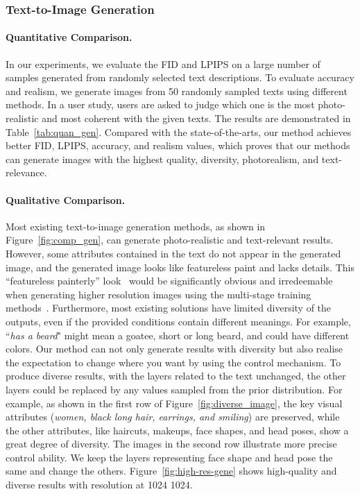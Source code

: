 \documentclass[final]{cvpr}
\begin{document}
\subsubsection{Text-to-Image Generation}
\label{subsec:exp_gen}

\paragraph{Quantitative Comparison.}
In our experiments, we evaluate the FID and LPIPS on a large number of samples generated from randomly selected text descriptions. 
To evaluate accuracy and realism, we generate images from 50 randomly sampled texts using different methods. In a user study, users are asked to judge which one is the most photo-realistic and most coherent with the given texts. 
The results are demonstrated in Table~\ref{tab:quan_gen}. 
Compared with the state-of-the-arts, our method achieves better FID, LPIPS, accuracy, and realism values, which proves that our methods can generate images with the highest quality, diversity, photorealism, and text-relevance. 

\vspace{-5pt}
\paragraph{Qualitative Comparison.} 
Most existing text-to-image generation methods, as shown in Figure~\ref{fig:comp_gen}, can generate photo-realistic and text-relevant results.
However, some attributes contained in the text do not appear in the generated image, and the generated image looks like featureless paint and lacks details.
This ``featureless painterly'' look~\cite{karras2019style} would be significantly obvious and irredeemable when generating higher resolution images using the multi-stage training methods~\cite{xu2018attngan,li2019control,zhu2019dmgan}.
Furthermore, most existing solutions have limited diversity of the outputs, even if the provided conditions contain different meanings. For example, ``\textit{has a beard}" might mean a goatee, short or long beard, and could have different colors.
Our method can not only generate results with diversity but also realise the expectation to change where you want by using the control mechanism.
To produce diverse results, with the layers related to the text unchanged, the other layers could be replaced by any values sampled from the prior distribution. 
For example, as shown in the first row of Figure~\ref{fig:diverse_image}, the key visual attributes (\textit{women, black long hair, earrings, and smiling}) are preserved, while the other attributes, like haircuts, makeups, face shapes, and head poses, show a great degree of diversity.
The images in the second row illustrate more precise control ability. We keep the layers representing face shape and head pose the same and change the others. 
Figure~\ref{fig:high-res-gene} shows high-quality and diverse results with resolution at 1024  1024. 
\end{document}
